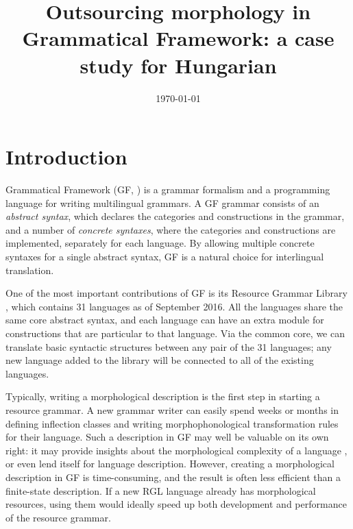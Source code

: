 \documentclass[10pt,a4paper]{article}
\begin{document}
\date{\today}
\title{Outsourcing morphology in Grammatical Framework: a case study for Hungarian}
\address{Department of Computer Science and Engineering \\ University of Gothenburg and Chalmers University of Technology \\ \tt inari@chalmers.se}



\maketitleabstract


\section{Introduction}
\label{sec:introduction}
Grammatical Framework (GF, \cite{ranta2004jfp}) is a grammar formalism and a programming 
language for writing multilingual grammars.
A GF grammar consists of an \emph{abstract syntax}, which declares the
categories and constructions in the grammar, and a number of \emph{concrete
  syntaxes}, where the categories and constructions are implemented,
separately for each language.
By allowing multiple concrete syntaxes for a single abstract syntax, GF is a natural 
choice for interlingual translation.

One of the most important contributions of GF is its Resource Grammar Library 
\cite{ranta2009lilt}, which contains 31 languages as of September 2016. All the languages 
share the same core abstract syntax, and each language can have an extra module for 
constructions that are particular to that language. Via the common core, we can 
translate basic syntactic structures between any pair of the 31 languages; any new 
language added to the library will be connected to all of the existing languages.

Typically, writing a morphological description is the first step in starting a resource grammar.
A new grammar writer can easily spend weeks or months in defining inflection classes 
and writing morphophonological transformation rules for their language. 
Such a description in GF may well be valuable on its own right: it may provide 
insights about the morphological complexity of a language
\cite{detrez_ranta2012eacl}, or even lend itself for language description.
However, creating a morphological description in GF is time-consuming, and the result 
is often less efficient than a finite-state description.
If a new RGL language already has morphological resources, using them would ideally
speed up both development and performance of the resource grammar.
\end{document}
